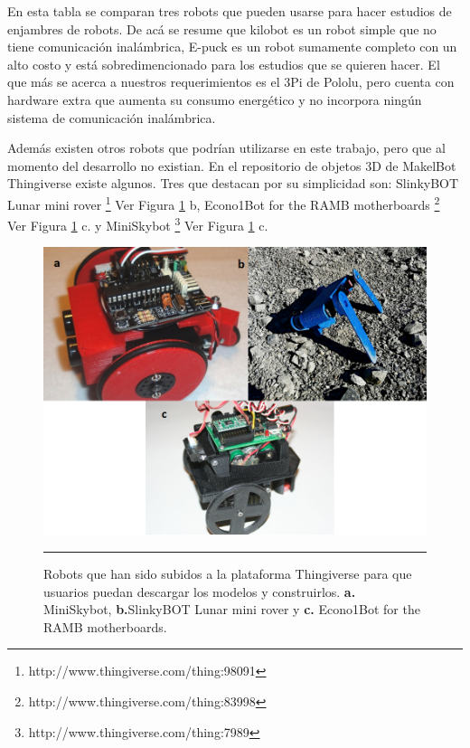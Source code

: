 En esta tabla se comparan tres robots que pueden usarse para hacer estudios de enjambres de robots. De acá se resume que kilobot es un robot simple que no tiene comunicación inalámbrica, E-puck es un robot sumamente completo con un alto costo y está sobredimencionado para los estudios que se quieren hacer. El que más se acerca a nuestros requerimientos es el 3Pi de Pololu, pero cuenta con hardware extra que aumenta su consumo energético y no incorpora ningún sistema de comunicación inalámbrica.

\FloatBarrier
Además existen otros robots que podrían utilizarse en este trabajo, pero que al momento del desarrollo no existian. En el repositorio de objetos 3D de MakelBot Thingiverse existe algunos. Tres que destacan por su simplicidad son: SlinkyBOT Lunar mini rover \footnote{http://www.thingiverse.com/thing:98091} Ver Figura \ref{fig:thingiverse} b, Econo1Bot for the RAMB motherboards \footnote{http://www.thingiverse.com/thing:83998}  Ver Figura \ref{fig:thingiverse} c. y MiniSkybot \footnote{http://www.thingiverse.com/thing:7989}  Ver Figura \ref{fig:thingiverse} c.
 
\begin{figure}[htbp]
	\centering
		\includegraphics[width=1\textwidth]{./Figures/thingiverse.png}
		\rule{35em}{0.5pt}
	\caption[Robots en Thingiverse]{Robots que han sido subidos a la plataforma Thingiverse para que usuarios puedan descargar los modelos y construirlos. \textbf{a.} MiniSkybot, \textbf{b.}SlinkyBOT Lunar mini rover y \textbf{c.} Econo1Bot for the RAMB motherboards.}
	\label{fig:thingiverse}
\end{figure}

